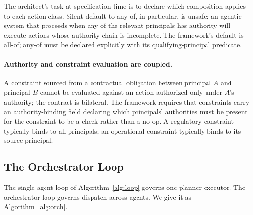 \documentclass[11pt,a4paper]{article}
\theoremstyle{remark}
\begin{document}
The architect's task at specification time is to declare which composition applies to each action class. Silent default-to-any-of, in particular, is unsafe: an agentic system that proceeds when any of the relevant principals has authority will execute actions whose authority chain is incomplete. The framework's default is all-of; any-of must be declared explicitly with its qualifying-principal predicate.

\paragraph{Authority and constraint evaluation are coupled.} A constraint sourced from a contractual obligation between principal $A$ and principal $B$ cannot be evaluated against an action authorized only under $A$'s authority; the contract is bilateral. The framework requires that constraints carry an authority-binding field declaring which principals' authorities must be present for the constraint to be a check rather than a no-op. A regulatory constraint typically binds to all principals; an operational constraint typically binds to its source principal.

\subsection{The Orchestrator Loop}\label{sec:orch-loop}

The single-agent loop of Algorithm~\ref{alg:loop} governs one planner-executor. The orchestrator loop governs dispatch across agents. We give it as Algorithm~\ref{alg:orch}.
\end{document}
